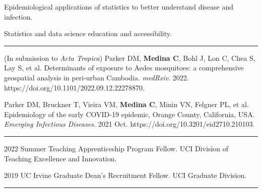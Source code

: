 \documentclass{article}
\begin{document}


\begin{description}
	\vspace{-2mm}
	\item[Research Interests]\hspace*{.1in}
		
		Epidemiological applications of statistics to better understand disease and infection.
		\vspace*{1mm}
		
		Statistics and data science education and accessibility.
		
\end{description}
\vspace{-2mm}
\rule{\linewidth}{1pt}




\begin{description}
	\vspace{-2mm}
	\item[Publications]\hspace*{.1in} 
	
	  (In submission to \textit{Acta Tropica}) Parker DM, \textbf{Medina C}, Bohl J, Lon C, Chea S, Lay S, et al. Determinants of exposure to Aedes mosquitoes: a comprehensive geospatial analysis in peri-urban Cambodia. \textit{medRxiv}. 2022. https://doi.org/10.1101/2022.09.12.22278870.
	
		Parker DM, Bruckner T, Vieira VM, \textbf{Medina C}, Minin VN, Felgner PL, et al. Epidemiology of the early COVID-19 epidemic, Orange County, California, USA. \textit{Emerging Infectious Diseases}. 2021 Oct. https://doi.org/10.3201/eid2710.210103. 

\end{description}
\vspace{-2mm}
\rule{\linewidth}{1pt}





\begin{description}
	\vspace{-2mm}
	\item[Fellowships]\hspace*{.1in}

		2022 Summer Teaching Apprenticeship Program Fellow. UCI Division of Teaching Excellence and Innovation.
		\vspace*{1mm}
		
		2019 UC Irvine Graduate Dean's Recruitment Fellow. UCI Graduate Division.

\end{description}
\vspace{-2mm}
\rule{\linewidth}{1pt}
\end{document}
